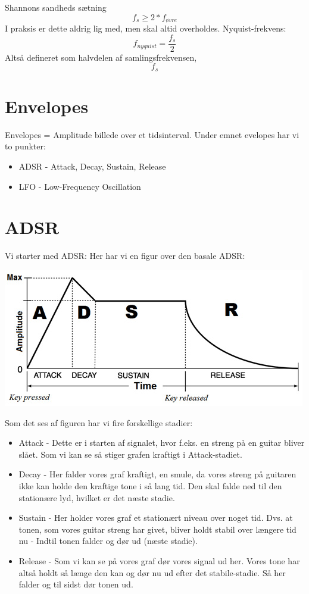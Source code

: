 \documentclass[12pt, letterpaper]{article}
\begin{document}
Shannons sandheds sætning
$$f_s\geq 2*f_{øvre}$$
I praksis er dette aldrig lig med, men skal altid overholdes. 
Nyquist-frekvens:
$$f_{nyquist} = \frac{f_s}{2}$$
Altså defineret som halvdelen af samlingsfrekvensen, $$f_s$$

\section{Envelopes}

Envelopes = Amplitude billede over et tidsinterval. 
Under emnet evelopes har vi to punkter: 
\begin{itemize}
\item ADSR - Attack, Decay, Sustain, Release
\item LFO - Low-Frequency Oscillation
\end{itemize}


\section{ADSR}


Vi starter med ADSR: 
Her har vi en figur over den basale ADSR: 

\begin{center}
\includegraphics[width=\textwidth]{billeder/ADSR}
\end{center}

Som det ses af figuren har vi fire forskellige stadier: 
\begin{itemize}
\item Attack - Dette er i starten af signalet, hvor f.eks. en streng på en guitar bliver slået. Som vi kan se så stiger grafen kraftigt i Attack-stadiet. 
\item Decay - Her falder vores graf kraftigt, en smule, da vores streng på guitaren ikke kan holde den kraftige tone i så lang tid. Den skal falde ned til den stationære lyd, hvilket er det næste stadie.  
\item Sustain - Her holder vores graf et stationært niveau over noget tid. Dvs. at tonen, som vores guitar streng har givet, bliver holdt stabil over længere tid nu - Indtil tonen falder og dør ud (næste stadie). 
\item Release - Som vi kan se på vores graf dør vores signal ud her. Vores tone har altså holdt så længe den kan og dør nu ud efter det stabile-stadie. Så her falder og til sidst dør tonen ud. 
\end{itemize}
\end{document}
